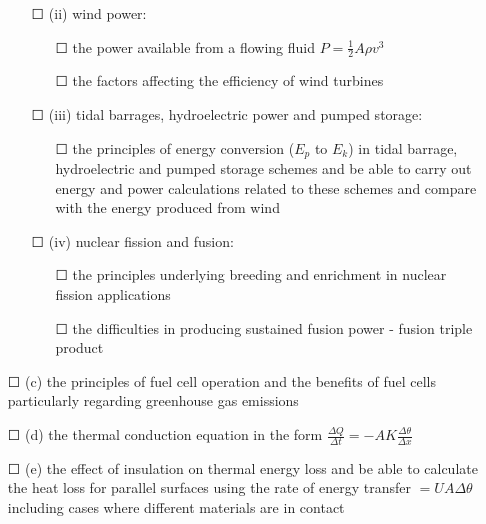\begin{itemize}
\begin{itemize}
\begin{itemize}
		\end{itemize}
		\item[\Large{$\Square$}](ii) wind power:
		\begin{itemize}
			\item[\Large{$\Square$}] the power available from a flowing fluid \(P=\frac{1}{2}A \rho v^{3} \)
			\item[\Large{$\Square$}] the factors affecting the efficiency of wind turbines
			
		\end{itemize}
		\item[\Large{$\Square$}](iii) tidal barrages, hydroelectric power and pumped storage:
		\begin{itemize}
			\item[\Large{$\Square$}] the principles of energy conversion (\(E_p\) to \(E_k\)) in tidal barrage,
			hydroelectric and pumped storage schemes and be able to carry out energy and power calculations related to these schemes and compare with the energy produced from wind
			
		\end{itemize}
		\item[\Large{$\Square$}](iv) nuclear fission and fusion:
		\begin{itemize}
			\item[\Large{$\Square$}] the principles underlying breeding and enrichment in nuclear
			fission applications
			\item[\Large{$\Square$}] the difficulties in producing sustained fusion power
			- fusion triple product
			
		\end{itemize}
	\end{itemize}
	\item[\Large{$\Square$}](c) the principles of fuel cell operation and the benefits of fuel cells particularly regarding greenhouse gas emissions
	\item[\Large{$\Square$}](d) the thermal conduction equation in the form \( \frac{\Delta Q}{\Delta t}= - A K \frac{\Delta \theta}{\Delta x} \)
	\item[\Large{$\Square$}](e) the effect of insulation on thermal energy loss and be able to calculate the heat loss for parallel surfaces using the rate of energy transfer \( =UA\Delta \theta\) including cases
	where different materials are in contact
	
\end{itemize}